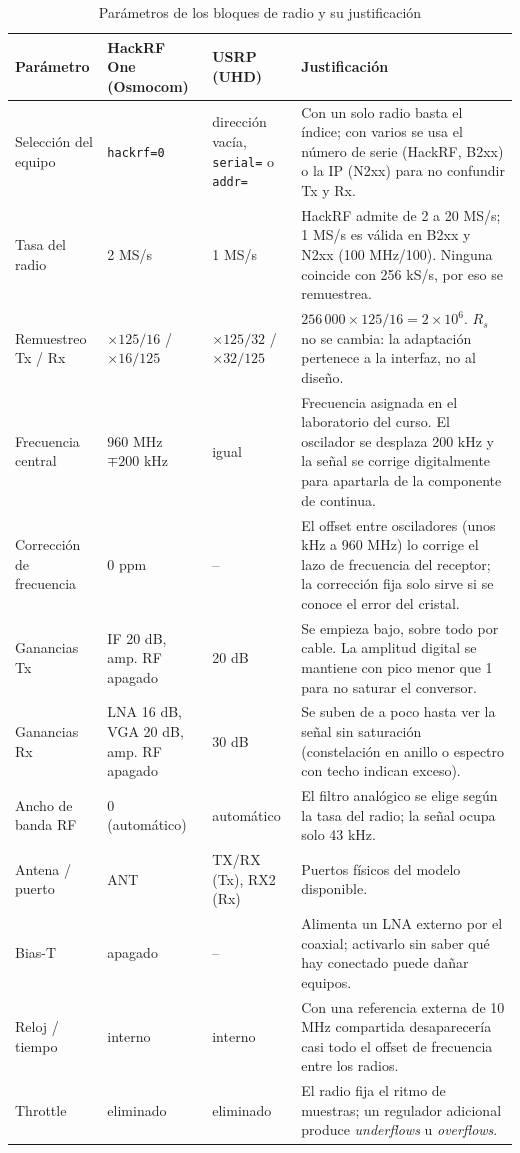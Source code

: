 \begin{table}[t]
    \centering
    \caption{Parámetros de los bloques de radio y su justificación}
    \label{tab:sdr}
    \footnotesize
    \begin{tabular}{@{}p{3.0cm}p{3.2cm}p{2.6cm}p{7.6cm}@{}}
        \toprule
        \textbf{Parámetro} & \textbf{HackRF One (Osmocom)} & \textbf{USRP (UHD)} & \textbf{Justificación} \\
        \midrule
        Selección del equipo & \texttt{hackrf=0} & dirección vacía, \texttt{serial=} o \texttt{addr=} & Con un solo radio basta el índice; con varios se usa el número de serie (HackRF, B2xx) o la IP (N2xx) para no confundir Tx y Rx. \\
        Tasa del radio & 2 MS/s & 1 MS/s & HackRF admite de 2 a 20 MS/s; 1 MS/s es válida en B2xx y N2xx (100 MHz/100). Ninguna coincide con 256 kS/s, por eso se remuestrea. \\
        Remuestreo Tx / Rx & $\times125/16$ / $\times16/125$ & $\times125/32$ / $\times32/125$ & $256\,000\times125/16=2\times10^6$. $R_s$ no se cambia: la adaptación pertenece a la interfaz, no al diseño. \\
        Frecuencia central & $960$ MHz $\mp 200$ kHz & igual & Frecuencia asignada en el laboratorio del curso. El oscilador se desplaza 200 kHz y la señal se corrige digitalmente para apartarla de la componente de continua. \\
        Corrección de frecuencia & 0 ppm & -- & El offset entre osciladores (unos kHz a 960 MHz) lo corrige el lazo de frecuencia del receptor; la corrección fija solo sirve si se conoce el error del cristal. \\
        Ganancias Tx & IF 20 dB, amp. RF apagado & 20 dB & Se empieza bajo, sobre todo por cable. La amplitud digital se mantiene con pico menor que 1 para no saturar el conversor. \\
        Ganancias Rx & LNA 16 dB, VGA 20 dB, amp. RF apagado & 30 dB & Se suben de a poco hasta ver la señal sin saturación (constelación en anillo o espectro con techo indican exceso). \\
        Ancho de banda RF & 0 (automático) & automático & El filtro analógico se elige según la tasa del radio; la señal ocupa solo 43 kHz. \\
        Antena / puerto & ANT & TX/RX (Tx), RX2 (Rx) & Puertos físicos del modelo disponible. \\
        Bias-T & apagado & -- & Alimenta un LNA externo por el coaxial; activarlo sin saber qué hay conectado puede dañar equipos. \\
        Reloj / tiempo & interno & interno & Con una referencia externa de 10 MHz compartida desaparecería casi todo el offset de frecuencia entre los radios. \\
        Throttle & eliminado & eliminado & El radio fija el ritmo de muestras; un regulador adicional produce \emph{underflows} u \emph{overflows}. \\
        \bottomrule
    \end{tabular}
\end{table}



